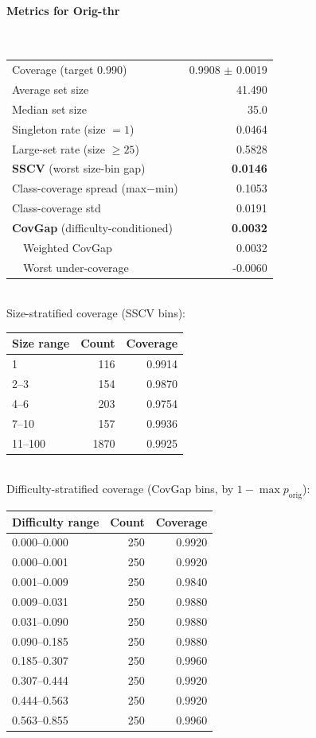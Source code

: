\documentclass[parskip=half]{scrartcl}
\begin{document}
\paragraph{Metrics for Orig-thr}~\\
\begin{tabular}{l r}
\hline
Coverage (target 0.990) & 0.9908 $\pm$ 0.0019 \\
Average set size & 41.490 \\
Median set size & 35.0 \\
Singleton rate (size $=1$) & 0.0464 \\
Large-set rate (size $\geq 25$) & 0.5828 \\
\textbf{SSCV} (worst size-bin gap) & \textbf{0.0146} \\
Class-coverage spread (max$-$min) & 0.1053 \\
Class-coverage std & 0.0191 \\
\textbf{CovGap} (difficulty-conditioned) & \textbf{0.0032} \\
~~Weighted CovGap & 0.0032 \\
~~Worst under-coverage & -0.0060 \\
\hline
\end{tabular}\\[0.5em]
\textsf{\scriptsize Size-stratified coverage (SSCV bins):}\\
\begin{tabular}{l r r}
\hline
Size range & Count & Coverage \\
\hline
1 & 116 & 0.9914 \\
2--3 & 154 & 0.9870 \\
4--6 & 203 & 0.9754 \\
7--10 & 157 & 0.9936 \\
11--100 & 1870 & 0.9925 \\
\hline
\end{tabular}\\[0.5em]
\textsf{\scriptsize Difficulty-stratified coverage (CovGap bins, by $1-\max p_{\mathrm{orig}}$):}\\
\begin{tabular}{l r r}
\hline
Difficulty range & Count & Coverage \\
\hline
0.000--0.000 & 250 & 0.9920 \\
0.000--0.001 & 250 & 0.9920 \\
0.001--0.009 & 250 & 0.9840 \\
0.009--0.031 & 250 & 0.9880 \\
0.031--0.090 & 250 & 0.9880 \\
0.090--0.185 & 250 & 0.9880 \\
0.185--0.307 & 250 & 0.9960 \\
0.307--0.444 & 250 & 0.9920 \\
0.444--0.563 & 250 & 0.9920 \\
0.563--0.855 & 250 & 0.9960 \\
\hline
\end{tabular}\\[0.5em]
\end{document}
